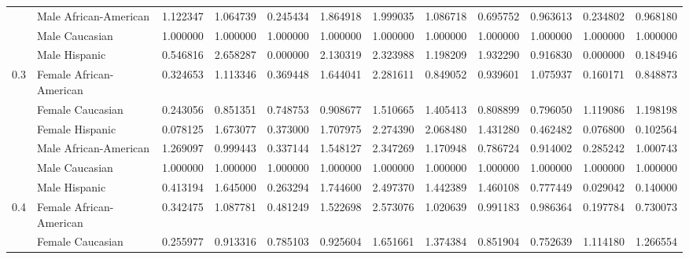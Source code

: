 \begin{tabular}{llrrrrrrrrrr}
    & Male African-American &       1.122347 &       1.064739 &       0.245434 &             1.864918 &       1.999035 &       1.086718 &         0.695752 &       0.963613 &       0.234802 &       0.968180 \\
    & Male Caucasian &       1.000000 &       1.000000 &       1.000000 &             1.000000 &       1.000000 &       1.000000 &         1.000000 &       1.000000 &       1.000000 &       1.000000 \\
    & Male Hispanic &       0.546816 &       2.658287 &       0.000000 &             2.130319 &       2.323988 &       1.198209 &         1.932290 &       0.916830 &       0.000000 &       0.184946 \\
0.3 & Female African-American &       0.324653 &       1.113346 &       0.369448 &             1.644041 &       2.281611 &       0.849052 &         0.939601 &       1.075937 &       0.160171 &       0.848873 \\
    & Female Caucasian &       0.243056 &       0.851351 &       0.748753 &             0.908677 &       1.510665 &       1.405413 &         0.808899 &       0.796050 &       1.119086 &       1.198198 \\
    & Female Hispanic &       0.078125 &       1.673077 &       0.373000 &             1.707975 &       2.274390 &       2.068480 &         1.431280 &       0.462482 &       0.076800 &       0.102564 \\
    & Male African-American &       1.269097 &       0.999443 &       0.337144 &             1.548127 &       2.347269 &       1.170948 &         0.786724 &       0.914002 &       0.285242 &       1.000743 \\
    & Male Caucasian &       1.000000 &       1.000000 &       1.000000 &             1.000000 &       1.000000 &       1.000000 &         1.000000 &       1.000000 &       1.000000 &       1.000000 \\
    & Male Hispanic &       0.413194 &       1.645000 &       0.263294 &             1.744600 &       2.497370 &       1.442389 &         1.460108 &       0.777449 &       0.029042 &       0.140000 \\
0.4 & Female African-American &       0.342475 &       1.087781 &       0.481249 &             1.522698 &       2.573076 &       1.020639 &         0.991183 &       0.986364 &       0.197784 &       0.730073 \\
    & Female Caucasian &       0.255977 &       0.913316 &       0.785103 &             0.925604 &       1.651661 &       1.374384 &         0.851904 &       0.752639 &       1.114180 &       1.266554 \\

\end{tabular}
